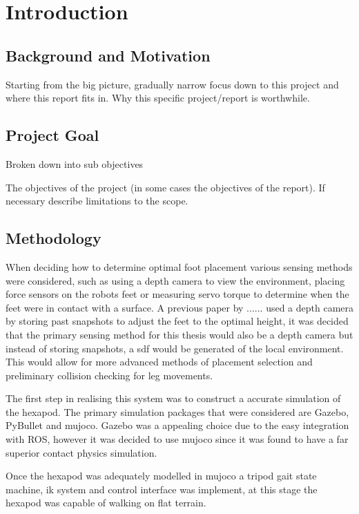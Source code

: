 \chapter{Introduction}

\section{Background and Motivation}

Starting from the big picture, gradually narrow focus down to this project and where this report fits in.
Why this specific project/report is worthwhile.


\section{Project Goal}
Broken down into sub objectives

The objectives of the project (in some cases the objectives of the report). If necessary describe limitations to the scope.


\section{Methodology}
When deciding how to determine optimal foot placement various sensing methods were considered, such as using a depth camera to view the environment,
placing force sensors on the robots feet or measuring servo torque to determine when the feet were in contact with a surface. A previous paper by ...... used a depth
camera by storing past snapshots to adjust the feet to the optimal height, it was decided that the primary sensing method for this thesis would also be a depth camera
but instead of storing snapshots, a \ac{sdf} would be generated of the local environment. This would allow for more advanced methods of placement selection
and preliminary collision checking for leg movements.

The first step in realising this system was to construct a accurate simulation of the hexapod. The primary simulation packages that were considered are Gazebo, PyBullet and \ac{mujoco}.
Gazebo was a appealing choice due to the easy integration with ROS, however it was decided to use \ac{mujoco} since it was found to have a far superior contact physics simulation.

Once the hexapod was adequately modelled in \ac{mujoco} a tripod gait state machine, \ac{ik} system and control interface was implement, at this stage the hexapod was capable of walking
on flat terrain.

